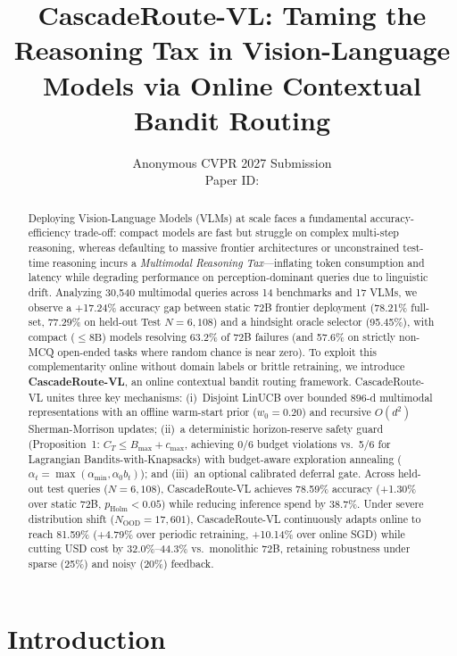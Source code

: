 \documentclass[10pt,twocolumn,letterpaper]{article}
\title{CascadeRoute-VL: Taming the Reasoning Tax in Vision-Language Models via Online Contextual Bandit Routing}
\author{
Anonymous CVPR 2027 Submission \\
Paper ID: \paperID
}
\begin{document}
\maketitle

\begin{abstract}
Deploying Vision-Language Models (VLMs) at scale faces a fundamental accuracy-efficiency trade-off: compact models are fast but struggle on complex multi-step reasoning, whereas defaulting to massive frontier architectures or unconstrained test-time reasoning incurs a \emph{Multimodal Reasoning Tax}---inflating token consumption and latency while degrading performance on perception-dominant queries due to linguistic drift. Analyzing 30,540 multimodal queries across 14 benchmarks and 17 VLMs, we observe a +17.24\% accuracy gap between static 72B frontier deployment (78.21\% full-set, 77.29\% on held-out Test $N{=}6{,}108$) and a hindsight oracle selector (95.45\%), with compact ($\le 8\text{B}$) models resolving 63.2\% of 72B failures (and 57.6\% on strictly non-MCQ open-ended tasks where random chance is near zero). To exploit this complementarity online without domain labels or brittle retraining, we introduce \textbf{CascadeRoute-VL}, an online contextual bandit routing framework. CascadeRoute-VL unites three key mechanisms: (i)~Disjoint LinUCB over bounded $896$-d multimodal representations with an offline warm-start prior ($w_0{=}0.20$) and recursive $O(d^2)$ Sherman-Morrison updates; (ii)~a deterministic horizon-reserve safety guard (Proposition~1: $C_T \le B_{\max} + c_{\max}$, achieving 0/6 budget violations vs.\ 5/6 for Lagrangian Bandits-with-Knapsacks) with budget-aware exploration annealing ($\alpha_t = \max(\alpha_{\min}, \alpha_0 b_t)$); and (iii)~an optional calibrated deferral gate. Across held-out test queries ($N{=}6{,}108$), CascadeRoute-VL achieves 78.59\% accuracy (+1.30\% over static 72B, $p_{\text{Holm}} < 0.05$) while reducing inference spend by 38.7\%. Under severe distribution shift ($N_{\text{OOD}}{=}17{,}601$), CascadeRoute-VL continuously adapts online to reach 81.59\% (+4.79\% over periodic retraining, +10.14\% over online SGD) while cutting USD cost by 32.0\%--44.3\% vs.\ monolithic 72B, retaining robustness under sparse (25\%) and noisy (20\%) feedback.
\end{abstract}

\section{Introduction}
\label{sec:intro}
\end{document}
